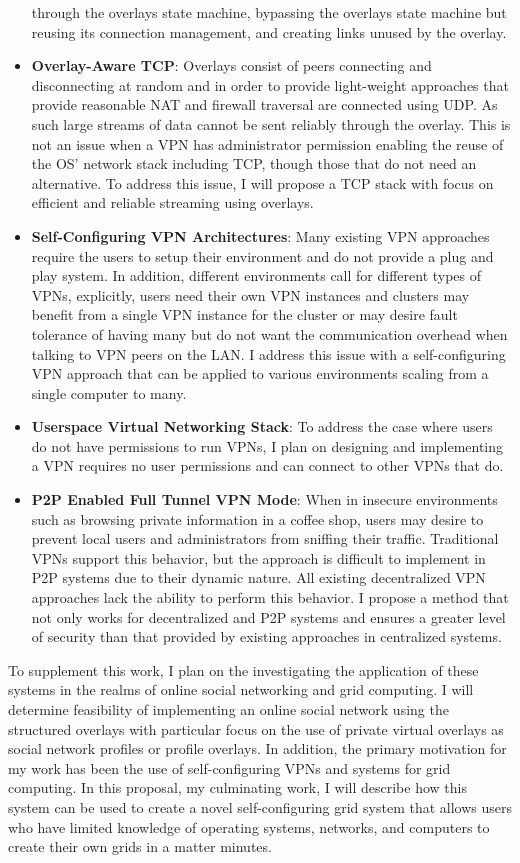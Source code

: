 \begin{itemize}
through the overlays state machine, bypassing the overlays state machine but
reusing its connection management, and creating links unused by the overlay.
\item \textbf{Overlay-Aware TCP}: Overlays consist of peers connecting and
disconnecting at random and in order to provide light-weight approaches that
provide reasonable NAT and firewall traversal are connected using UDP.  As such
large streams of data cannot be sent reliably through the overlay.  This is not
an issue when a VPN has administrator permission enabling the reuse of the OS'
network stack including TCP, though those that do not need an alternative.  To
address this issue, I will propose a TCP stack with focus on efficient and
reliable streaming using overlays.
\item \textbf{Self-Configuring VPN Architectures}: Many existing VPN approaches
require the users to setup their environment and do not provide a plug and play
system.  In addition, different environments call for different types of VPNs,
explicitly, users need their own VPN instances and clusters may benefit from
a single VPN instance for the cluster or may desire fault tolerance of having
many but do not want the communication overhead when talking to VPN peers on
the LAN.  I address this issue with a self-configuring VPN approach that can be
applied to various environments scaling from a single computer to many.
\item \textbf{Userspace Virtual Networking Stack}: To address the case where
users do not have permissions to run VPNs, I plan on designing and implementing
a VPN requires no user permissions and can connect to other VPNs that do.
\item \textbf{P2P Enabled Full Tunnel VPN Mode}: When in insecure environments
such as browsing private information in a coffee shop, users may desire to
prevent local users and administrators from sniffing their traffic.  Traditional
VPNs support this behavior, but the approach is difficult to implement in P2P
systems due to their dynamic nature.  All existing decentralized VPN approaches
lack the ability to perform this behavior.  I propose a method that not only
works for decentralized and P2P systems and ensures a greater level of security
than that provided by existing approaches in centralized systems.
\end{itemize}

To supplement this work, I plan on the investigating the application of these
systems in the realms of online social networking and grid computing.  I will
determine feasibility of implementing an online social network using the 
structured overlays with particular focus on the use of private virtual
overlays as social network profiles or profile overlays.  In addition, the
primary motivation for my work has been the use of self-configuring VPNs and
systems for grid computing.  In this proposal, my culminating work, I will
describe how this system can be used to create a novel self-configuring grid
system that allows users who have limited knowledge of operating systems,
networks, and computers to create their own grids in a matter minutes.

